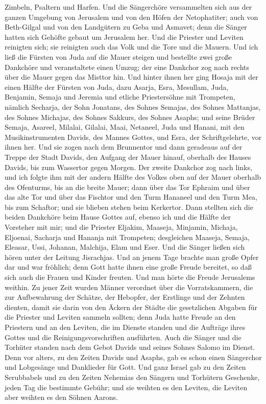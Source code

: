 Zimbeln, Psaltern und Harfen.  Und die Sängerchöre
versammelten sich aus der ganzen Umgebung von Jerusalem und von den
Höfen der Netophatiter;  auch von Beth-Gilgal und von den
Landgütern zu Geba und Asmavet; denn die Sänger hatten sich Gehöfte
gebaut um Jerusalem her.  Und die Priester und Leviten
reinigten sich; sie reinigten auch das Volk und die Tore und die Mauern.
 Und ich ließ die Fürsten von Juda auf die Mauer steigen
und bestellte zwei große Dankchöre und veranstaltete einen Umzug; der
eine Dankchor zog nach rechts über die Mauer gegen das Misttor hin.
 Und hinter ihnen her ging Hosaja mit der einen Hälfte
der Fürsten von Juda,  dazu Asarja, Esra, 
Mesullam, Juda, Benjamin,  Semaja und Jeremia und etliche
Priestersöhne mit Trompeten, nämlich Secharja, der Sohn Jonatans, des
Sohnes Semajas, des Sohnes Mattanjas, des Sohnes Michajas, des Sohnes
Sakkurs, des Sohnes Asaphs;  und seine Brüder Semaja,
Asareel, Milalai, Gilalai, Maai, Netaneel, Juda und Hanani, mit den
Musikinstrumenten Davids, des Mannes Gottes, und Esra, der
Schriftgelehrte, vor ihnen her.  Und sie zogen nach dem
Brunnentor und dann geradeaus auf der Treppe der Stadt Davids, den
Aufgang der Mauer hinauf, oberhalb des Hauses Davids, bis zum Wassertor
gegen Morgen.  Der zweite Dankchor zog nach links, und
ich folgte ihm mit der andern Hälfte des Volkes oben auf der Mauer
oberhalb des Ofenturms, bis an die breite Mauer;  dann
über das Tor Ephraim und über das alte Tor und über das Fischtor und den
Turm Hananeel und den Turm Mea, bis zum Schaftor; und sie blieben stehen
beim Kerkertor.  Dann stellten sich die beiden Dankchöre
beim Hause Gottes auf, ebenso ich und die Hälfte der Vorsteher mit mir;
 und die Priester Eljakim, Maaseja, Minjamin, Michaja,
Eljoenai, Sacharja und Hananja mit Trompeten; 
desgleichen Maaseja, Semaja, Eleasar, Ussi, Johanan, Malchija, Elam und
Eser. Und die Sänger ließen sich hören unter der Leitung Jisrachjas.
 Und an jenem Tage brachte man große Opfer dar und war
fröhlich; denn Gott hatte ihnen eine große Freude bereitet, so daß sich
auch die Frauen und Kinder freuten. Und man hörte die Freude Jerusalems
weithin.  Zu jener Zeit wurden Männer verordnet über die
Vorratskammern, die zur Aufbewahrung der Schätze, der Hebopfer, der
Erstlinge und der Zehnten dienten, damit sie darin von den Äckern der
Städte die gesetzlichen Abgaben für die Priester und Leviten sammeln
sollten; denn Juda hatte Freude an den Priestern und an den Leviten,
 die im Dienste standen und die Aufträge ihres Gottes und
die Reinigungsvorschriften ausführten. Auch die Sänger und die Torhüter
standen nach dem Gebot Davids und seines Sohnes Salomo im Dienst.
 Denn vor alters, zu den Zeiten Davids und Asaphs, gab es
schon einen Sängerchor und Lobgesänge und Danklieder für Gott.
 Und ganz Israel gab zu den Zeiten Serubbabels und zu den
Zeiten Nehemias den Sängern und Torhütern Geschenke, jeden Tag die
bestimmte Gebühr; und sie weihten es den Leviten, die Leviten aber
weihten es den Söhnen Aarons.


